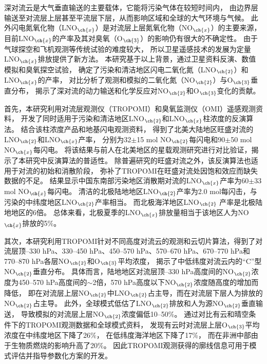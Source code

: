 
\abstract
{
深对流云是大气垂直输送的主要载体，它能将污染气体在较短时间内，
由边界层输送至对流层上层甚至平流层下层，从而影响区域和全球的大气环境与气候。
此外闪电氮氧化物（LNO$_{\ch{x}}$）是对流层上层氮氧化物（NO$_{\ch{x}}$）的主要来源，目前LNO$_{\ch{x}}$的产率及其对臭氧（O$_{\ch{3}}$）的影响仍有很大的不确定性。
由于气球探空和飞机观测等传统试验的难度较大，
所以卫星遥感技术的发展为定量LNO$_{\ch{x}}$排放提供了新方法。
本研究基于以上背景，通过卫星资料反演、数值模拟和臭氧探空试验，
确定了污染和清洁地区闪电二氧化氮（LNO$_{\ch{2}}$）和LNO$_{\ch{x}}$的产率，
对比分析了观测和模拟的二氧化氮（NO$_{\ch{2}}$）与O$_{\ch{3}}$垂直分布，
揭示了深对流的动力输送和化学反应对NO$_{\ch{2}}$和O$_{\ch{3}}$变化的贡献。

首先，本研究利用对流层观测仪（TROPOMI）和臭氧监测仪（OMI）遥感观测资料，
开发了同时适用于污染和清洁地区LNO$_{\ch{2}}$和LNO$_{\ch{x}}$柱浓度的反演算法。
结合该柱浓度产品和地基闪电观测资料，
得到了北美大陆地区旺盛对流的LNO$_{\ch{2}}$和LNO$_{\ch{x}}$产率，
分别为32$\pm$15 mol NO$_{\ch{2}}$每闪电和90$\pm$50 mol NO$_{\ch{x}}$每闪电。
将该结果与前人在北美地区的星载观测研究进行对比验证，揭示了本研究中反演算法的普适性。
除普遍研究的旺盛对流之外，该反演算法也适用于对流的初始和消散阶段，
弥补了TROPOMI在旺盛对流处因饱和效应而缺失数据的不足。
结果显示中国东南部污染地区消散期对流的LNO$_{\ch{x}}$产率为60$\pm$33 mol NO$_{\ch{x}}$每闪电。
清洁的北极陆地地区LNO$_{\ch{2}}$产率为2.0 mol每闪击，与污染的中纬度地区LNO$_{\ch{2}}$产率相当。
而北极海洋地区LNO$_{\ch{2}}$ 产率是北极陆地地区的6倍。
总体来看，北极夏季的LNO$_{\ch{x}}$排放量相当于该地区人为NO$_{\ch{x}}$排放的5\%。

其次，本研究利用TROPOMI针对不同高度对流云的观测和云切片算法，得到了对流层顶--330 hPa、330--450 hPa、450--570 hPa、570--670 hPa、670--770 hPa和770--870 hPa各层NO$_{\ch{2}}$和O$_{\ch{3}}$平均浓度，
揭示了中低纬度对流云内的“C”型NO$_{\ch{2}}$垂直分布。
具体而言，陆地地区对流层顶--330 hPa高度间的NO$_{\ch{2}}$浓度为450--570 hPa高度间的$\sim$2倍，570 hPa高度以下NO$_{\ch{2}}$浓度随高度的增加而降低，
即在对流层上层NO$_{\ch{2}}$中LNO$_{\ch{2}}$占主导，而在对流层下层人为排放的NO$_{\ch{2}}$占主导。
此外，全球模式低估了LNO$_{\ch{2}}$排放和人为源NO$_{\ch{2}}$垂直输送，
导致模拟的对流层上层NO$_{\ch{2}}$浓度偏低10--50\%。
通过对比有云和晴空条件下的TROPOMI观测数据和全球模式资料，
发现有云时对流层上层O$_{\ch{3}}$平均浓度在中纬度地区下降了26\%，
在低纬度海洋地区下降了17\%，
而在非洲中部由于生物质燃烧的影响升高了20\%。
因此TROPOMI观测获得的廓线信息可用于模式评估并指导参数化方案的开发。

}
